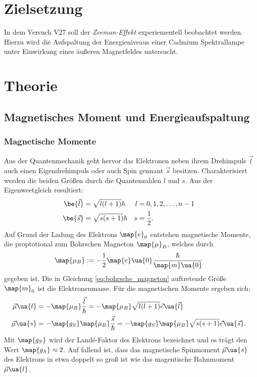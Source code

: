 \setcounter{page}{1}
\section*{Zielsetzung}
In dem Versuch V27 soll der \emph{Zeeman-Effekt} experiementell beobachtet werden.
Hierzu wird die Aufspaltung der Energieniveaus einer Cadmium Spektrallampe
unter Einwirkung eines äußeren Magnetfeldes untersucht.

\section{Theorie}

\subsection{Magnetisches Moment und Energieaufspaltung}
\subsubsection{Magnetische Momente}
Aus der Quantenmechanik geht hervor das Elektronen neben ihrem Drehimpuls $\vec{l}$ auch einen
Eigendrehimpuls oder auch Spin gennant $\vec{s}$ besitzen. Charakterisiert werden die beiden Größen durch die
Quantenzahlen $l$ und $s$. Aus der Eigenweetgleich resultiert:
\begin{align*}
\be{\vec{l}}&=\sqrt{l(l+1)}\hbar & l&=0,1,2,\dots,n-1\\
\be{\vec{s}}&=\sqrt{s(s+1)}\hbar & s&=\frac{1}{2}.
\end{align*}
Auf Grund der Ladung des Elektrons $\map{e}_0$ entstehen magnetische Momente, die
proptotional zum Bohrschen Magneton $\map{\mu}_B$, welches durch
\begin{equation}
  \label{eq:bohrsche_magneton}
  \map{\mu_B}:=-\frac{1}{2}\map{e}\ua{0} \frac{\hbar}{\map{m}\ua{0}}
\end{equation}
gegeben ist. Die in Gleichung \eqref{eq:bohrsche_magneton} auftretende Größe $\map{m}_0$ ist die Elektronenmasse.
Für die magnetischen Momente ergeben sich:
\begin{align*}
  \vec{\mu}\ua{l}&=-\map{\mu_B}\frac{\vec{l}}{\hbar}=-\map{\mu_B}\sqrt{l(l+1)}\vec{e}\ua{\vec{l}} \\
  \vec{\mu}\ua{s}&=-\map{g_S}\map{\mu_B}\frac{\vec{s}}{\hbar}=-\map{g_S}\map{\mu_B}\sqrt{s(s+1)}\vec{e}\ua{\vec{s}}.
\end{align*}
Mit $\map{g_S}$ wird der Landé-Faktor des Elektrons bezeichnet und es trägt den Wert $\map{g_S}\approx 2$.
Auf fallend ist, dass das magnetische Spinmoment $\vec{\mu}\ua{s}$ des Elektrons in etwa doppelt
so groß ist wie das magentische Bahnmoment $\vec{\mu}\ua{l}$.


